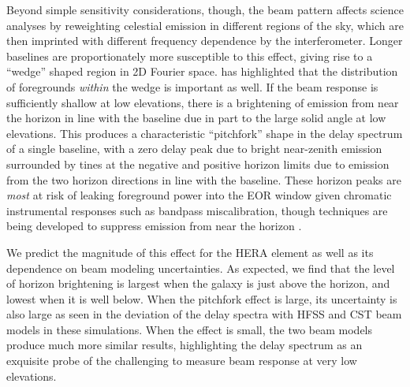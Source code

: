 \documentclass{emulateapj}
\begin{document}
Beyond simple sensitivity considerations, though, the beam pattern affects science analyses by reweighting celestial emission in different regions of the sky, which are then imprinted with different frequency dependence by the interferometer. Longer baselines are proportionately more susceptible to this effect, giving rise to a ``wedge'' shaped region in 2D Fourier space. \citet{nithya15} has highlighted that the distribution of foregrounds \textit{within} the wedge is important as well. If the beam response is sufficiently shallow at low elevations, there is a brightening of emission from near the horizon in line with the baseline due in part to the large solid angle at low elevations. This produces a characteristic ``pitchfork'' shape in the delay spectrum of a single baseline, with a zero delay peak due to bright near-zenith emission surrounded by tines at the negative and positive horizon limits due to emission from the two horizon directions in line with the baseline. These horizon peaks are \textit{most} at risk of leaking foreground power into the EOR window given chromatic instrumental responses such as bandpass miscalibration, though techniques are being developed to suppress emission from near the horizon \citep{parsonsoptimalfringeratefiltering}.

We predict the magnitude of this effect for the HERA element as well as its dependence on beam modeling uncertainties. As expected, we find that the level of horizon brightening is largest when the galaxy is just above the horizon, and lowest when it is well below. When the pitchfork effect is large, its uncertainty is also large as seen in the deviation of the delay spectra with HFSS and CST beam models in these simulations. When the effect is small, the two beam models produce much more similar results, highlighting the delay spectrum as an exquisite probe of the challenging to measure beam response at very low elevations.
\end{document}
